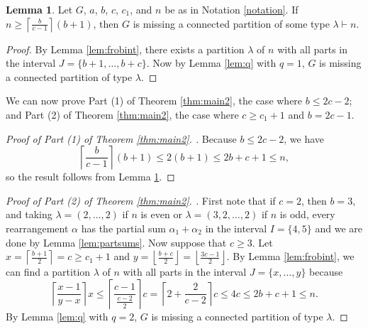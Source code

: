 \documentclass[12pt]{amsart}  %
\theoremstyle{definition}
\newtheorem{lemma}[theorem]{Lemma}
\theoremstyle{remark}
\numberwithin{equation}{section}
\begin{document}
\begin{lemma}\label{lem:nb2c} Let $G$, $a$, $b$, $c$, $c_1$, and $n$ be as in Notation \ref{notation}. If $n\geq\left\lceil\frac b{c-1}\right\rceil(b+1)$, then $G$ is missing a connected partition of some type $\lambda\vdash n$. 
\end{lemma}

\begin{proof}
By Lemma \ref{lem:frobint}, there exists a partition $\lambda$ of $n$ with all parts in the interval $J=\{b+1,\ldots,b+c\}$. Now by Lemma \ref{lem:q} with $q=1$, $G$ is missing a connected partition of type $\lambda$.
\end{proof}

We can now prove Part (1) of Theorem \ref{thm:main2}, the case where $b\leq 2c-2$; and Part (2) of Theorem \ref{thm:main2}, the case where $c\geq c_1+1$ and $b=2c-1$. 

\begin{proof}[Proof of Part (1) of Theorem \ref{thm:main2}. ] Because $b\leq 2c-2$, we have
\begin{equation*}
\left\lceil\frac b{c-1}\right\rceil (b+1)\leq 2(b+1)\leq 2b+c+1\leq n,
\end{equation*}
so the result follows from Lemma \ref{lem:nb2c}. 
\end{proof}

\begin{proof}[Proof of Part (2) of Theorem \ref{thm:main2}. ]
First note that if $c=2$, then $b=3$, and taking $\lambda=(2,\ldots,2)$ if $n$ is even or $\lambda=(3,2,\ldots,2)$ if $n$ is odd, every rearrangement $\alpha$ has the partial sum $\alpha_1+\alpha_2$ in the interval $I=\{4,5\}$ and we are done by Lemma \ref{lem:partsums}. Now suppose that $c\geq 3$. Let $x=\left\lceil\frac{b+1}2\right\rceil=c\geq c_1+1$ and $y=\left\lfloor\frac{b+c}2\right\rfloor=\left\lfloor\frac{3c-1}2\right\rfloor$. By Lemma \ref{lem:frobint}, we can find a partition $\lambda$ of $n$ with all parts in the interval $J=\{x,\ldots,y\}$ because
\begin{equation*}
\left\lceil\frac{x-1}{y-x}\right\rceil x\leq\left\lceil\frac{c-1}{\frac{c-2}2}\right\rceil c=\left\lceil 2+\frac 2{c-2}\right\rceil c\leq 4c\leq 2b+c+1\leq n. 
\end{equation*} 
By Lemma \ref{lem:q} with $q=2$, $G$ is missing a connected partition of type $\lambda$.
\end{proof}
\end{document}
